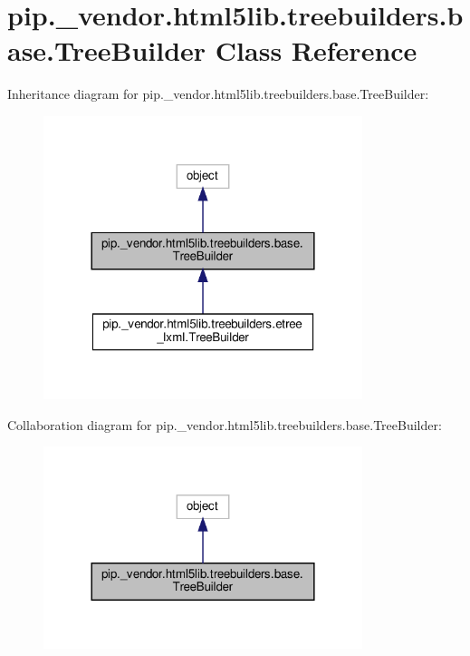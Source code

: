 \hypertarget{classpip_1_1__vendor_1_1html5lib_1_1treebuilders_1_1base_1_1TreeBuilder}{}\section{pip.\+\_\+vendor.\+html5lib.\+treebuilders.\+base.\+Tree\+Builder Class Reference}
\label{classpip_1_1__vendor_1_1html5lib_1_1treebuilders_1_1base_1_1TreeBuilder}


Inheritance diagram for pip.\+\_\+vendor.\+html5lib.\+treebuilders.\+base.\+Tree\+Builder\+:
\nopagebreak
\begin{figure}[H]
\begin{center}
\leavevmode
\includegraphics[width=264pt]{classpip_1_1__vendor_1_1html5lib_1_1treebuilders_1_1base_1_1TreeBuilder__inherit__graph}
\end{center}
\end{figure}


Collaboration diagram for pip.\+\_\+vendor.\+html5lib.\+treebuilders.\+base.\+Tree\+Builder\+:
\nopagebreak
\begin{figure}[H]
\begin{center}
\leavevmode
\includegraphics[width=264pt]{classpip_1_1__vendor_1_1html5lib_1_1treebuilders_1_1base_1_1TreeBuilder__coll__graph}
\end{center}
\end{figure}
